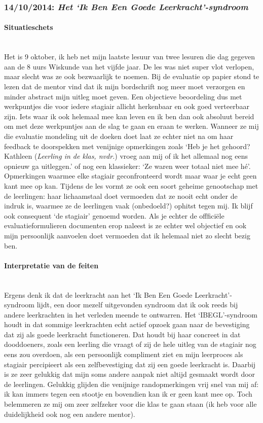 \documentclass[a4paper,11pt]{article}
\newcommand{\tussen}[1]{\paragraph*{#1}\mbox{}\\}
\theoremstyle{definition}
\begin{document}
\subsubsection{14/10/2014: \emph{Het `Ik Ben Een Goede Leerkracht'-syndroom}}
\tussen{Situatieschets}
Het is 9 oktober, ik heb net mijn laatste lesuur van twee lesuren die dag gegeven aan de 8 uurs Wiskunde 
van het vijfde jaar. De les was niet super vlot verlopen, maar slecht was ze ook 
bezwaarlijk te noemen. Bij de evaluatie op papier stond te lezen dat de mentor vind dat ik mijn bordschrift nog 
meer moet verzorgen en minder abstract mijn uitleg moet geven. Een objectieve 
beoordeling dus met werkpuntjes die voor iedere stagiair allicht herkenbaar en ook goed verteerbaar zijn. 
Iets waar ik ook helemaal mee kan leven en ik ben dan ook absoluut bereid om met deze werkpuntjes aan de slag te gaan en eraan te werken. Wanneer ze mij die evaluatie mondeling uit de doeken doet laat ze echter 
niet na om haar feedback te doorspekken met venijnige opmerkingen zoals `Heb je het gehoord? 
Kathleen (\emph{Leerling in de klas, nvdr.}) vroeg aan mij of ik het allemaal nog eens opnieuw ga uitleggen.' of 
nog een klassieker: `Ze waren weer totaal niet mee hé'. Opmerkingen waarmee elke stagiair geconfronteerd wordt maar waar je echt geen kant mee op kan. Tijdens de les vormt ze ook een soort geheime genootschap met de leerlingen:  
haar lichaamstaal doet vermoeden dat ze nooit echt onder de indruk is, waarmee ze de leerlingen vaak (onbedoeld?) ophitst tegen mij. 
Ik blijf ook consequent `de stagiair' genoemd worden.
Als je echter de offficiële
evaluatieformulieren documenten erop naleest is ze echter wel objectief en ook mijn persoonlijk aanvoelen 
doet vermoeden dat ik helemaal niet zo slecht bezig ben.
\tussen{Interpretatie van de feiten}
Ergens denk ik dat de leerkracht aan het `Ik Ben Een Goede Leerkracht'-syndroom 
lijdt, een door mezelf uitgevonden syndroom dat ik ook reeds bij andere 
leerkrachten in het verleden meende te ontwarren. Het `IBEGL'-syndroom houdt in dat sommige leerkrachten
echt actief opzoek gaan naar de bevestiging dat zij als goede leerkracht functioneren. Dat houdt bij haar concreet in 
dat dooddoeners, zoals een leerling die vraagt of zij de hele uitleg van de stagiair nog  
eens zou overdoen, als een persoonlijk compliment ziet en mijn leerproces als 
stagiair percipieert als een zelfbevestiging dat zij een goede leerkracht is. Daarbij is ze zeer gelukkig dat mijn 
soms andere aanpak niet altijd gesmaakt wordt door de leerlingen. Gelukkig 
glijden die venijnige randopmerkingen vrij snel van mij af: ik kan immers tegen 
een stootje en bovendien kan ik er geen kant mee op. Toch belemmeren ze mij om zeer 
zelfzeker voor die klas te gaan staan (ik heb voor alle duidelijkheid ook nog een andere 
mentor).
\end{document}
